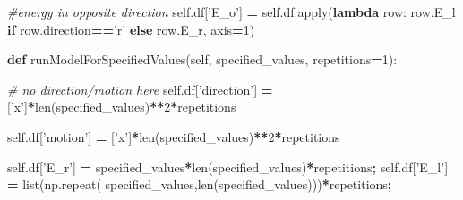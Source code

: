 \documentclass[12pt,twoside]{reedthesis}
\newenvironment{Shaded}{\begin{snugshade}}{\end{snugshade}}
\newcommand{\BuiltInTok}[1]{#1}
\newcommand{\CommentTok}[1]{\textcolor[rgb]{0.56,0.35,0.01}{\textit{#1}}}
\newcommand{\ControlFlowTok}[1]{\textcolor[rgb]{0.13,0.29,0.53}{\textbf{#1}}}
\newcommand{\DecValTok}[1]{\textcolor[rgb]{0.00,0.00,0.81}{#1}}
\newcommand{\KeywordTok}[1]{\textcolor[rgb]{0.13,0.29,0.53}{\textbf{#1}}}
\newcommand{\NormalTok}[1]{#1}
\newcommand{\OperatorTok}[1]{\textcolor[rgb]{0.81,0.36,0.00}{\textbf{#1}}}
\newcommand{\StringTok}[1]{\textcolor[rgb]{0.31,0.60,0.02}{#1}}
\newcommand{\VariableTok}[1]{\textcolor[rgb]{0.00,0.00,0.00}{#1}}
\begin{document}
\begin{Shaded}
\begin{Highlighting}[]
        \CommentTok{#energy in opposite direction}
        \VariableTok{self}\NormalTok{.df[}\StringTok{'E_o'}\NormalTok{] }\OperatorTok{=} \VariableTok{self}\NormalTok{.df.}\BuiltInTok{apply}\NormalTok{(}\KeywordTok{lambda}\NormalTok{ row: }
\NormalTok{               row.E_l }\ControlFlowTok{if}\NormalTok{ row.direction}\OperatorTok{==}\StringTok{'r'} 
               \ControlFlowTok{else}\NormalTok{ row.E_r, }
\NormalTok{               axis}\OperatorTok{=}\DecValTok{1}\NormalTok{)}
        
    \KeywordTok{def}\NormalTok{ runModelForSpecifiedValues(}\VariableTok{self}\NormalTok{, specified_values, repetitions}\OperatorTok{=}\DecValTok{1}\NormalTok{):}

        \CommentTok{# no direction/motion here}
        \VariableTok{self}\NormalTok{.df[}\StringTok{'direction'}\NormalTok{] }\OperatorTok{=} 
\NormalTok{          [}\StringTok{'x'}\NormalTok{]}\OperatorTok{*}\BuiltInTok{len}\NormalTok{(specified_values)}\OperatorTok{**}\DecValTok{2}\OperatorTok{*}\NormalTok{repetitions}
          
        \VariableTok{self}\NormalTok{.df[}\StringTok{'motion'}\NormalTok{] }\OperatorTok{=} 
\NormalTok{          [}\StringTok{'x'}\NormalTok{]}\OperatorTok{*}\BuiltInTok{len}\NormalTok{(specified_values)}\OperatorTok{**}\DecValTok{2}\OperatorTok{*}\NormalTok{repetitions}

        \VariableTok{self}\NormalTok{.df[}\StringTok{'E_r'}\NormalTok{] }\OperatorTok{=} 
\NormalTok{          specified_values}\OperatorTok{*}\BuiltInTok{len}\NormalTok{(specified_values)}\OperatorTok{*}\NormalTok{repetitions}\OperatorTok{;}
        \VariableTok{self}\NormalTok{.df[}\StringTok{'E_l'}\NormalTok{] }\OperatorTok{=} \BuiltInTok{list}\NormalTok{(np.repeat(}
\NormalTok{            specified_values,}\BuiltInTok{len}\NormalTok{(specified_values)))}\OperatorTok{*}\NormalTok{repetitions}\OperatorTok{;}
        

\end{Highlighting}
\end{Shaded}
\end{document}
